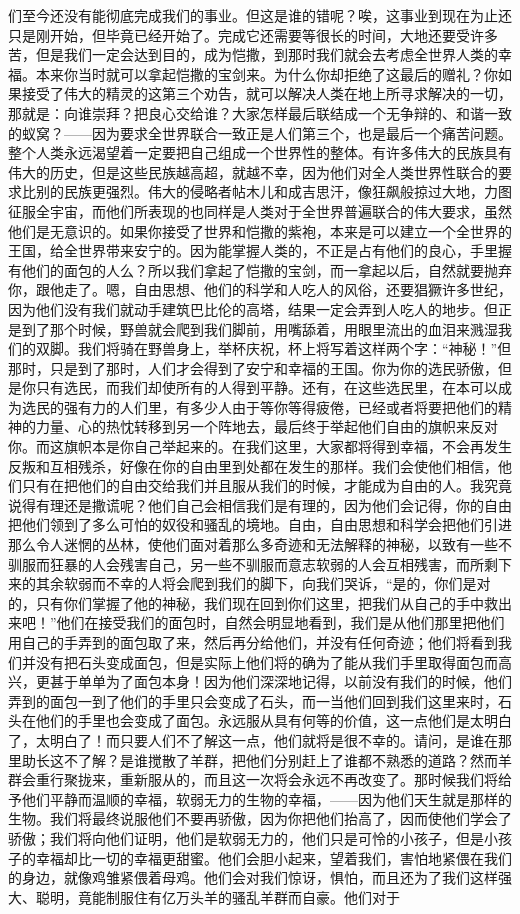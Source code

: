 们至今还没有能彻底完成我们的事业。但这是谁的错呢？唉，这事业到现在为止还只是刚开始，但毕竟已经开始了。完成它还需要等很长的时间，大地还要受许多苦，但是我们一定会达到目的，成为恺撒，到那时我们就会去考虑全世界人类的幸福。本来你当时就可以拿起恺撒的宝剑来。为什么你却拒绝了这最后的赠礼？你如果接受了伟大的精灵的这第三个劝告，就可以解决人类在地上所寻求解决的一切，那就是：向谁崇拜？把良心交给谁？大家怎样最后联结成一个无争辩的、和谐一致的蚁窝？——因为要求全世界联合一致正是人们第三个，也是最后一个痛苦问题。整个人类永远渴望着一定要把自己组成一个世界性的整体。有许多伟大的民族具有伟大的历史，但是这些民族越高超，就越不幸，因为他们对全人类世界性联合的要求比别的民族更强烈。伟大的侵略者帖木儿和成吉思汗，像狂飙般掠过大地，力图征服全宇宙，而他们所表现的也同样是人类对于全世界普遍联合的伟大要求，虽然他们是无意识的。如果你接受了世界和恺撒的紫袍，本来是可以建立一个全世界的王国，给全世界带来安宁的。因为能掌握人类的，不正是占有他们的良心，手里握有他们的面包的人么？所以我们拿起了恺撒的宝剑，而一拿起以后，自然就要抛弃你，跟他走了。嗯，自由思想、他们的科学和人吃人的风俗，还要猖獗许多世纪，因为他们没有我们就动手建筑巴比伦的高塔，结果一定会弄到人吃人的地步。但正是到了那个时候，野兽就会爬到我们脚前，用嘴舔着，用眼里流出的血泪来溅湿我们的双脚。我们将骑在野兽身上，举杯庆祝，杯上将写着这样两个字：“神秘！”但那时，只是到了那时，人们才会得到了安宁和幸福的王国。你为你的选民骄傲，但是你只有选民，而我们却使所有的人得到平静。还有，在这些选民里，在本可以成为选民的强有力的人们里，有多少人由于等你等得疲倦，已经或者将要把他们的精神的力量、心的热忱转移到另一个阵地去，最后终于举起他们自由的旗帜来反对你。而这旗帜本是你自己举起来的。在我们这里，大家都将得到幸福，不会再发生反叛和互相残杀，好像在你的自由里到处都在发生的那样。我们会使他们相信，他们只有在把他们的自由交给我们并且服从我们的时候，才能成为自由的人。我究竟说得有理还是撒谎呢？他们自己会相信我们是有理的，因为他们会记得，你的自由把他们领到了多么可怕的奴役和骚乱的境地。自由，自由思想和科学会把他们引进那么令人迷惘的丛林，使他们面对着那么多奇迹和无法解释的神秘，以致有一些不驯服而狂暴的人会残害自己，另一些不驯服而意志软弱的人会互相残害，而所剩下来的其余软弱而不幸的人将会爬到我们的脚下，向我们哭诉，“是的，你们是对的，只有你们掌握了他的神秘，我们现在回到你们这里，把我们从自己的手中救出来吧！”他们在接受我们的面包时，自然会明显地看到，我们是从他们那里把他们用自己的手弄到的面包取了来，然后再分给他们，并没有任何奇迹；他们将看到我们并没有把石头变成面包，但是实际上他们将的确为了能从我们手里取得面包而高兴，更甚于单单为了面包本身！因为他们深深地记得，以前没有我们的时候，他们弄到的面包一到了他们的手里只会变成了石头，而一当他们回到我们这里来时，石头在他们的手里也会变成了面包。永远服从具有何等的价值，这一点他们是太明白了，太明白了！而只要人们不了解这一点，他们就将是很不幸的。请问，是谁在那里助长这不了解？是谁搅散了羊群，把他们分别赶上了谁都不熟悉的道路？然而羊群会重行聚拢来，重新服从的，而且这一次将会永远不再改变了。那时候我们将给予他们平静而温顺的幸福，软弱无力的生物的幸福，——因为他们天生就是那样的生物。我们将最终说服他们不要再骄傲，因为你把他们抬高了，因而使他们学会了骄傲；我们将向他们证明，他们是软弱无力的，他们只是可怜的小孩子，但是小孩子的幸福却比一切的幸福更甜蜜。他们会胆小起来，望着我们，害怕地紧偎在我们的身边，就像鸡雏紧偎着母鸡。他们会对我们惊讶，惧怕，而且还为了我们这样强大、聪明，竟能制服住有亿万头羊的骚乱羊群而自豪。他们对于